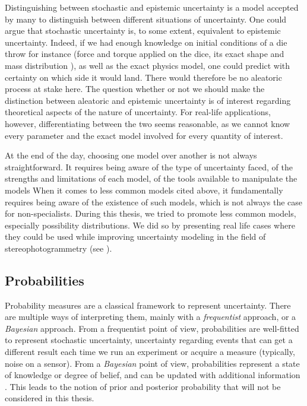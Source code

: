 \begin{remark}
    Distinguishing between stochastic and epistemic uncertainty is a model accepted by many to distinguish between different situations of uncertainty. One could argue that stochastic uncertainty is, to some extent, equivalent to epistemic uncertainty. Indeed, if we had enough knowledge on initial conditions of a die throw for instance (force and torque applied on the dice, its exact shape and mass distribution \etc), as well as the exact physics model, one could predict with certainty on which side it would land. There would therefore be no aleatoric process at stake here. The question whether or not we should make the distinction between aleatoric and epistemic uncertainty is of interest regarding theoretical aspects of the nature of uncertainty. For real-life applications, however, differentiating between the two seems reasonable, as we cannot know every parameter and the exact model involved for every quantity of interest. 
\end{remark}

At the end of the day, choosing one model over another is not always straightforward. It requires being aware of the type of uncertainty faced, of the strengths and limitations of each model, of the tools available to manipulate the models \etc When it comes to less common models cited above, it fundamentally requires being aware of the existence of such models, which is not always the case for non-specialists. During this thesis, we tried to promote less common models, especially possibility distributions. We did so by presenting real life cases where they could be used while improving uncertainty modeling in the field of stereophotogrammetry (see ).

\subsection{Probabilities}\label{sec:probabilities}
Probability measures are a classical framework to represent uncertainty. There are multiple ways of interpreting them, mainly with a \textit{frequentist} approach, or a \textit{Bayesian} approach. From a frequentist point of view, probabilities are well-fitted to represent stochastic uncertainty, \ie uncertainty regarding events that can get a different result each time we run an experiment or acquire a measure (typically, noise on a sensor). From a \textit{Bayesian} point of view, probabilities represent a state of knowledge or degree of belief, and can be updated with additional information \cite{irvine_philosophies_2009}. This leads to the notion of prior and posterior probability that will not be considered in this thesis.

